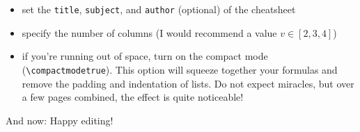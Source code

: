 \begin{itemize}
 \item set the \texttt{title}, \texttt{subject}, and \texttt{author} (optional) of the cheatsheet
 \item specify the number of columns (I would recommend a value $v \in [2,3,4]$)
 \item if you're running out of space, turn on the compact mode (\texttt{\textbackslash compactmodetrue}). This option will squeeze together your formulas and remove the padding and indentation of lists. Do not expect miracles, but over a few pages combined, the effect is quite noticeable!
\end{itemize}

And now: Happy editing!
